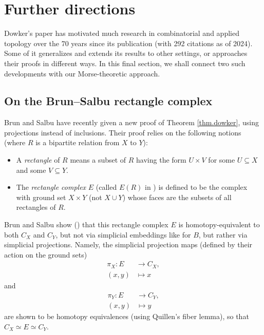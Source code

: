 \documentclass[numbers=enddot,12pt,final,onecolumn,notitlepage]{scrartcl}%
\theoremstyle{definition}
\begin{document}


\section{Further directions}

Dowker's paper \cite{Dowker52} has motivated much research in combinatorial
and applied topology over the 70 years since its publication (with 292
citations as of 2024).
Some of it generalizes and extends its results to other settings, or
approaches their proofs in different ways.
In this final section, we shall connect two such developments with our
Morse-theoretic approach.

\subsection{On the Brun--Salbu rectangle complex}

Brun and Salbu \cite{BruSal22} have recently given a new proof of
Theorem \ref{thm.dowker}, using projections instead of inclusions.
Their proof relies on the following notions (where $R$ is a bipartite
relation from $X$ to $Y$):

\begin{itemize}
\item A \emph{rectangle} of $R$ means a subset of $R$ having the form $U\times
V$ for some $U\subseteq X$ and some $V\subseteq Y$.

\item The \emph{rectangle complex} $E$ (called $E\left(  R\right)  $ in
\cite{BruSal22}) is defined to be the complex with ground set $X\times Y$ (not
$X\cup Y$) whose faces are the subsets of all rectangles of $R$.
\end{itemize}

Brun and Salbu show (\cite[Theorem 4.3]{BruSal22}) that this rectangle complex
$E$ is homotopy-equivalent to both $C_{X}$ and $C_{Y}$, but not via simplicial
embeddings like for $B$, but rather via simplicial projections. Namely, the
simplicial projection maps (defined by their action on the ground sets)%
\begin{align*}
\pi_{X}:E &  \rightarrow C_{X},\\
\left(  x,y\right)   &  \mapsto x
\end{align*}
and%
\begin{align*}
\pi_{Y}:E &  \rightarrow C_{Y},\\
\left(  x,y\right)   &  \mapsto y
\end{align*}
are shown to be homotopy equivalences (using Quillen's fiber lemma), so that
$C_{X}\simeq E\simeq C_{Y}$.
\end{document}

